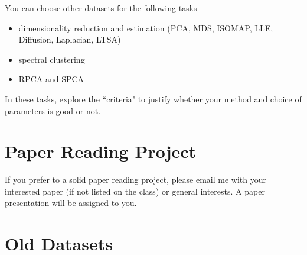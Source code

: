 \documentclass[11pt]{article}
\begin{document}
You can choose other datasets for the following tasks

\begin{itemize}
\item dimensionality reduction and estimation (PCA, MDS, ISOMAP, LLE, Diffusion, Laplacian, LTSA)
\item spectral clustering 
\item RPCA and SPCA  
\end{itemize}

In these tasks, explore the ``criteria" to justify whether your method and choice of parameters is good or not.  

\section{Paper Reading Project}

If you prefer to a solid paper reading project, please email me with your interested paper (if not listed on the class) or general interests. A paper presentation will be assigned to you.  

\section*{Old Datasets}
\end{document}
